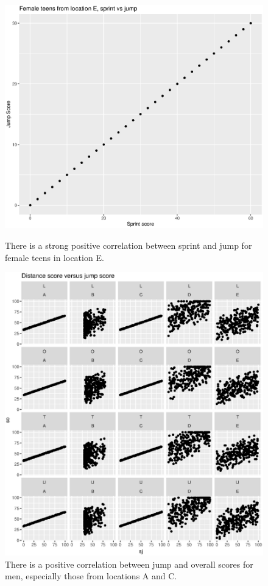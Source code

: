 \documentclass[runningheads]{llncs}
\begin{document}
\begin{figure}
\begin{multicols}{2}
    \includegraphics[width=\linewidth]{fTeSprintJump.eps} \vspace{-0.7cm} \caption{There is a strong positive correlation between sprint and jump for female teens in location E.} \label{fTeSprintJump} \par
\end{multicols}
\begin{multicols}{2}
    \includegraphics[width=\linewidth]{menACjumover.eps} \vspace{-0.8cm} \caption{There is a positive correlation between jump and overall scores for men, especially those from locations A and C.} \label{menACjumover} \par


\end{multicols}
\end{figure}
\end{document}
